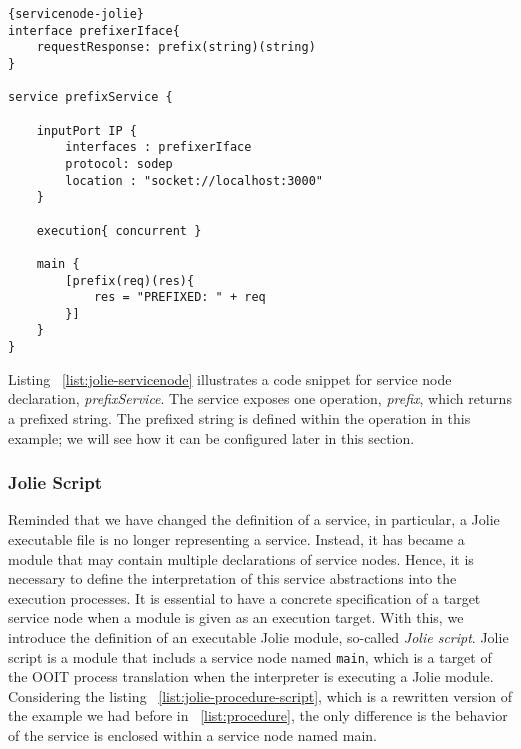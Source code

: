 \begin{listing}[h]

    \lstset{language=Jolie,
        style=codeStyle,
        numbers=left,
        firstnumber=1
    }
    \begin{lstlisting}[frame=tlrb, caption= {Jolie Service Node Example}, label={list:jolie-servicenode} ]{servicenode-jolie}
interface prefixerIface{
    requestResponse: prefix(string)(string)
}

service prefixService {
    
    inputPort IP {
        interfaces : prefixerIface
        protocol: sodep
        location : "socket://localhost:3000"
    }

    execution{ concurrent }

    main {
        [prefix(req)(res){
            res = "PREFIXED: " + req
        }]
    }
}
    \end{lstlisting}
\end{listing}

Listing ~\ref{list:jolie-servicenode} illustrates a code snippet for service node declaration, \textit{prefixService}. The service exposes one operation, \textit{prefix}, which returns a prefixed string. The prefixed string is defined within the operation in this example; we will see how it can be configured later in this section.

\FloatBarrier

\subsubsection*{Jolie Script}

Reminded that we have changed the definition of a service, in particular, a Jolie executable file is no longer representing a service. Instead, it has became a module that may contain multiple declarations of service nodes. Hence, it is necessary to define the interpretation of this service abstractions into the execution processes.
It is essential to have a concrete specification of a target service node when a module is given as an execution target.
With this, we introduce the definition of an executable Jolie module, so-called \textit{Jolie script}.
Jolie script is a module that includs a service node named \texttt{main}, which is a target of the OOIT process translation when the interpreter is executing a Jolie module. Considering the listing ~\ref{list:jolie-procedure-script}, which is a rewritten version of the example we had before in ~\ref{list:procedure}, the only difference is the behavior of the service is enclosed within a service node named main. 

